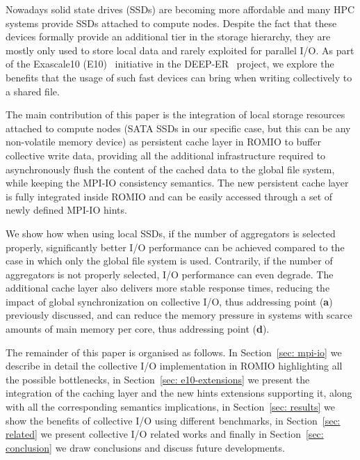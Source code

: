 Nowadays solid state drives (SSDs) are becoming more affordable and many HPC systems provide SSDs attached to compute nodes. Despite the fact that these devices formally provide an additional tier in the storage hierarchy, they are mostly only used to store local data and rarely exploited for parallel I/O. As part of the Exascale10 (E10)~\cite{e10} initiative in the DEEP-ER~\cite{deep-er} project, we explore the benefits that the usage of such fast devices can bring when writing collectively to a shared file.

The main contribution of this paper is the integration of local storage resources attached to compute nodes (SATA SSDs in our specific case, but this can be any non-volatile memory device) as persistent cache layer in ROMIO to buffer collective write data, providing all the additional infrastructure required to asynchronously flush the content of the cached data to the global file system, while keeping the MPI-IO consistency semantics. The new persistent cache layer is fully integrated inside ROMIO and can be easily accessed through a set of newly defined MPI-IO hints.

We show how when using local SSDs, if the number of aggregators is selected properly, significantly better I/O performance can be achieved compared to the case in which only the global file system is used. Contrarily, if the number of aggregators is not properly selected, I/O performance can even degrade. The additional cache layer also delivers more stable response times, reducing the impact of global synchronization on collective I/O, thus addressing point (\textbf{a}) previously discussed, and can reduce the memory pressure in systems with scarce amounts of main memory per core, thus addressing point (\textbf{d}).

The remainder of this paper is organised as follows. In Section~\ref{sec: mpi-io} we describe in detail the collective I/O implementation in ROMIO highlighting all the possible bottlenecks, in Section~\ref{sec: e10-extensions} we present the integration of the caching layer and the new hints extensions supporting it, along with all the corresponding semantics implications, in Section~\ref{sec: results} we show the benefits of collective I/O using different benchmarks, in Section~\ref{sec: related} we present collective I/O related works and finally in Section~\ref{sec: conclusion} we draw conclusions and discuss future developments.
